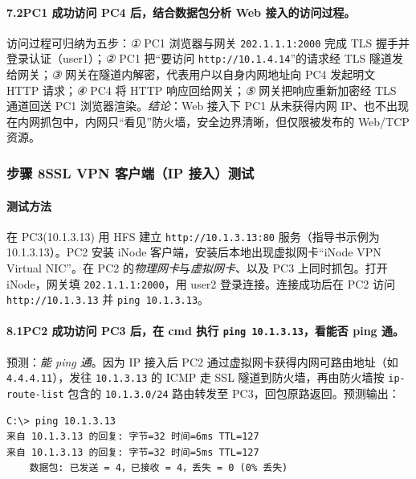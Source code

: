 \documentclass[12pt,a4paper]{article}
\begin{document}
\paragraph{7.2\quad PC1 成功访问 PC4 后，结合数据包分析 Web 接入的访问过程。}
访问过程可归纳为五步：\emph{①} PC1 浏览器与网关 \texttt{202.1.1.1:2000} 完成 TLS 握手并登录认证（user1）；\emph{②} PC1 把“要访问 \texttt{http://10.1.4.14}”的请求经 TLS 隧道发给网关；\emph{③} 网关在隧道内解密，代表用户以自身内网地址向 PC4 发起明文 HTTP 请求；\emph{④} PC4 将 HTTP 响应回给网关；\emph{⑤} 网关把响应重新加密经 TLS 通道回送 PC1 浏览器渲染。\emph{结论}：Web 接入下 PC1 从未获得内网 IP、也不出现在内网抓包中，内网只“看见”防火墙，安全边界清晰，但仅限被发布的 Web/TCP 资源。

\subsubsection*{步骤 8\quad SSL VPN 客户端（IP 接入）测试}
\paragraph{测试方法}在 PC3(10.1.3.13) 用 HFS 建立 \texttt{http://10.1.3.13:80} 服务（指导书示例为 10.1.3.13）。PC2 安装 iNode 客户端，安装后本地出现虚拟网卡“iNode VPN Virtual NIC”。在 PC2 的\emph{物理网卡}与\emph{虚拟网卡}、以及 PC3 上同时抓包。打开 iNode，网关填 \texttt{202.1.1.1:2000}，用 user2 登录连接。连接成功后在 PC2 访问 \texttt{http://10.1.3.13} 并 \texttt{ping 10.1.3.13}。

\paragraph{8.1\quad PC2 成功访问 PC3 后，在 cmd 执行 \texttt{ping 10.1.3.13}，看能否 ping 通。}
预测：\emph{能 ping 通}。因为 IP 接入后 PC2 通过虚拟网卡获得内网可路由地址（如 \texttt{4.4.4.11}），发往 \texttt{10.1.3.13} 的 ICMP 走 SSL 隧道到防火墙，再由防火墙按 \texttt{ip-route-list} 包含的 \texttt{10.1.3.0/24} 路由转发至 PC3，回包原路返回。预测输出：
\begin{lstlisting}[basicstyle=\ttfamily\scriptsize]
C:\> ping 10.1.3.13
来自 10.1.3.13 的回复: 字节=32 时间=6ms TTL=127
来自 10.1.3.13 的回复: 字节=32 时间=5ms TTL=127
    数据包: 已发送 = 4，已接收 = 4，丢失 = 0 (0% 丢失)
\end{lstlisting}
\end{document}
